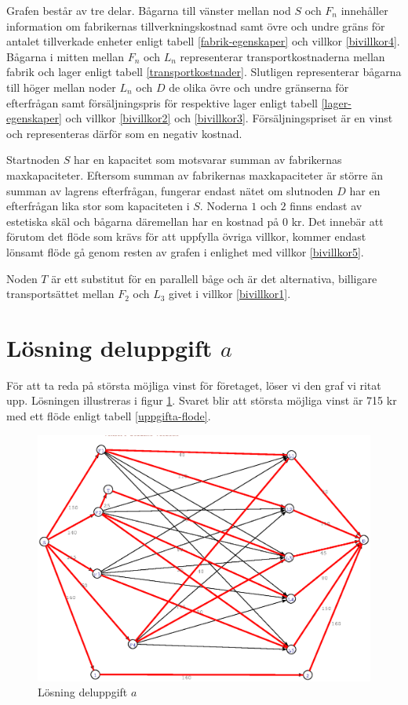 \documentclass[titlepage, a4paper]{article}
\begin{document}
Grafen består av tre delar. Bågarna till vänster mellan nod $S$ och $F_{n}$ innehåller information om fabrikernas tillverkningskostnad samt övre och undre gräns för antalet tillverkade enheter enligt tabell \ref{fabrik-egenskaper} och villkor \ref{bivillkor4}. Bågarna i mitten mellan $F_{n}$ och $L_{n}$ representerar transportkostnaderna mellan fabrik och lager enligt tabell \ref{transportkostnader}. Slutligen representerar bågarna till höger mellan noder $L_{n}$ och $D$ de olika övre och undre gränserna för efterfrågan samt försäljningspris för respektive lager enligt tabell \ref{lager-egenskaper} och villkor \ref{bivillkor2} och \ref{bivillkor3}. Försäljningspriset är en vinst och representeras därför som en negativ kostnad.

Startnoden $S$ har en kapacitet som motsvarar summan av fabrikernas maxkapaciteter. Eftersom summan av fabrikernas maxkapaciteter är större än summan av lagrens efterfrågan, fungerar endast nätet om slutnoden $D$ har en efterfrågan lika stor som kapaciteten i $S$. Noderna $1$ och $2$ finns endast av estetiska skäl och bågarna däremellan har en kostnad på 0 kr. Det innebär att förutom det flöde som krävs för att uppfylla övriga villkor, kommer endast lönsamt flöde gå genom resten av grafen i enlighet med villkor \ref{bivillkor5}.

Noden $T$ är ett substitut för en parallell båge och är det alternativa, billigare transportsättet mellan $F_{2}$ och $L_{3}$ givet i villkor \ref{bivillkor1}.

\section{Lösning deluppgift $a$}

För att ta reda på största möjliga vinst för företaget, löser vi den graf vi ritat upp. Lösningen illustreras i figur \ref{uppgifta-losning}. Svaret blir att största möjliga vinst är 715 kr med ett flöde enligt tabell \ref{uppgifta-flode}.

\begin{figure}[h!]
\centerline{\includegraphics[scale=0.65]{laborationsuppgift_13a_solved.ps}}
\caption{Lösning deluppgift $a$} \label{uppgifta-losning}
\end{figure}
\end{document}
